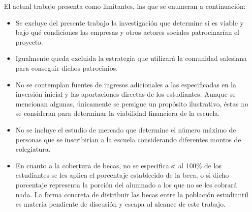 El actual trabajo presenta como limitantes, las que se enumeran a continuación:

\begin{itemize}
	\item Se excluye del presente trabajo la investigación que determine si es viable y bajo qué condiciones las empresas y otros actores sociales patrocinarían el proyecto.
	\item Igualmente queda excluida la estrategia que utilizará la comunidad salesiana para conseguir dichos patrocinios.
	\item No se contemplan fuentes de ingresos adicionales a las especificadas en la inversión inicial y las aportaciones directas de los estudiantes. Aunque se mencionan algunas, únicamente se persigue un propósito ilustrativo, éstas no se consideran para determinar la viabilidad financiera de la escuela.
	\item No se incluye el estudio de mercado que determine el número máximo de personas que se inscribirían a la escuela considerando diferentes montos de colegiatura. %
	\item En cuanto a la cobertura de becas, no se especifica si al 100\% de los estudiantes se les aplica el porcentaje establecido de la beca, o si dicho porcentaje representa la porción del alumnado a los que no se les cobrará nada. La forma concreta de distribuir las becas entre la población estudiantil es materia pendiente de discusión y escapa al alcance de este trabajo.
\end{itemize}





